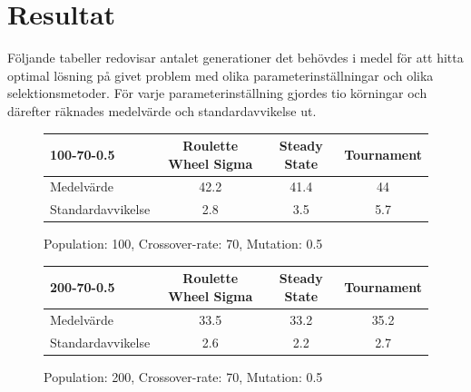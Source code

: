 \documentclass[titlepage, a4paper, 12pt]{article}
\begin{document}
\section{Resultat}\label{sec:resultat}
Följande tabeller redovisar antalet generationer det behövdes i medel
för att hitta optimal lösning på givet problem med olika
parameterinställningar och olika selektionsmetoder. För varje
parameterinställning gjordes tio körningar och därefter räknades
medelvärde och standardavvikelse ut.

\begin{figure}[H]
\begin{tabular}{lccc}
\hline
100-70-0.5 & Roulette Wheel Sigma & Steady State & Tournament \\
\hline
Medelvärde & 42.2 & 41.4 & 44 \\
Standardavvikelse & 2.8 & 3.5 & 5.7 \\
\hline
\end{tabular}
\caption{Population: 100, Crossover-rate: 70, Mutation: 0.5}\label{tab:mut05}
\end{figure}

\begin{figure}[H]
\begin{tabular}{lccc}
\hline
200-70-0.5 & Roulette Wheel Sigma & Steady State & Tournament \\
\hline
Medelvärde & 33.5 & 33.2 & 35.2 \\
Standardavvikelse & 2.6 & 2.2 & 2.7 \\
\hline
\end{tabular}
\caption{Population: 200, Crossover-rate: 70, Mutation: 0.5}\label{tab:pop200}
\end{figure}

\end{document}
